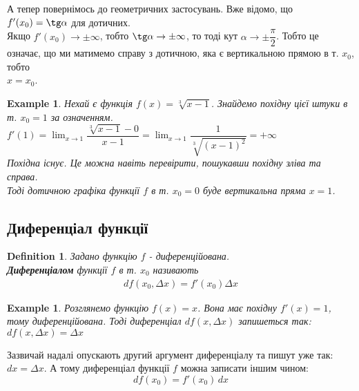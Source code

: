 \documentclass[a4paper, 14pt]{article}
\theoremstyle{theoremdd}
\theoremstyle{theoremdd}
\newtheorem{definition}[theorem]{Definition}
\theoremstyle{theoremdd}
\theoremstyle{theoremdd}
\newtheorem{example}[theorem]{Example}
\theoremstyle{theoremdd}
\theoremstyle{theoremdd}
\theoremstyle{theoremdd}
\theoremstyle{theoremdd}
\begin{document}
А тепер повернімось до геометричних застосувань. Вже відомо, що $f'(x_0) = \tg \alpha$ для дотичних.\\
Якщо $f'(x_0) \to \pm \infty$, тобто $\tg \alpha \to \pm \infty$, то тоді кут $\alpha \to \pm \dfrac{\pi}{2}$. Тобто це означає, що ми матимемо справу з дотичною, яка є вертикальною прямою в т. $x_0$, тобто\\
$x=x_0$.

\begin{example}
Нехай є функція $f(x) = \sqrt[3]{x-1}$. Знайдемо похідну цієї штуки в т. $x_0 = 1$ за означенням.\\
$f'(1) = \displaystyle \lim_{x \to 1} \dfrac{\sqrt[3]{x-1}-0}{x-1} = \lim_{x \to 1} \dfrac{1}{\sqrt[3]{(x-1)^2}} = + \infty$\\
Похідна існує. Це можна навіть перевірити, пошукавши похідну зліва та справа.\\
Тоді дотичною графіка функції $f$ в т. $x_0 = 0$ буде вертикальна пряма $x = 1$.\\
\begin{figure}[H]
\centering
{
}
\end{figure}
\end{example}

\subsection{Диференціал функції}
\begin{definition}
Задано функцію $f$ - диференційована.\\
\textbf{Диференціалом} функції $f$ в т. $x_0$ називають
\begin{align*}
df(x_0,\Delta x) = f'(x_0) \Delta x
\end{align*}
\end{definition}

\begin{example}
Розглянемо функцію $f(x) = x$. Вона має похідну $f'(x) = 1$, тому диференційована. Тоді диференціал $df(x,\Delta x)$ запишеться так:\\
$df(x,\Delta x) = \Delta x$
\end{example}
Зазвичай надалі опускають другий аргумент диференціалу та пишут уже так: $dx = \Delta x$. А тому диференціал функції $f$ можна записати іншим чином:
$$ df(x_0) = f'(x_0)\,dx $$
\end{document}
